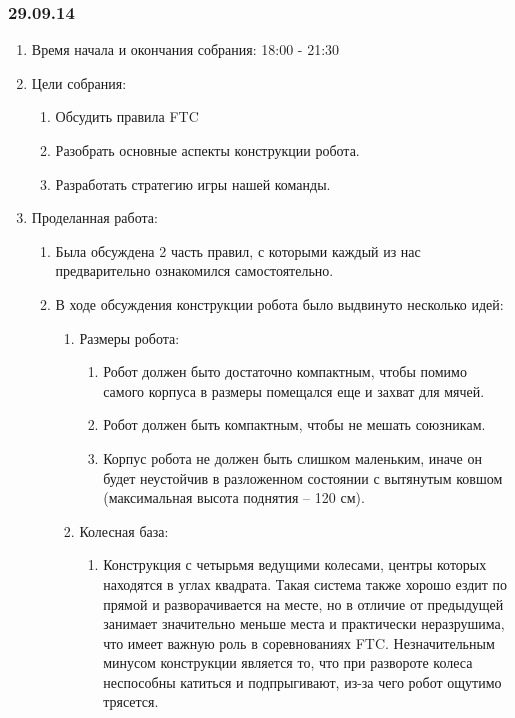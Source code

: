 	
\subsubsection{29.09.14}

\begin{enumerate}
	\item Время начала и окончания собрания:
	18:00 - 21:30
	\item Цели собрания:
	\begin{enumerate}
	  \item Обсудить правила FTC 
	  
	  \item Разобрать основные аспекты конструкции робота.
	  
      \item Разработать стратегию игры нашей команды.
    \end{enumerate}
	\item Проделанная работа:
	\begin{enumerate}
	  \item Была обсуждена 2 часть правил, с которыми каждый из нас предварительно ознакомился самостоятельно.
	  
	  \item В ходе обсуждения конструкции робота было выдвинуто несколько идей:
	  \begin{enumerate}
	    \item Размеры робота:
	    \begin{enumerate}
	      \item Робот должен быто достаточно компактным, чтобы помимо самого корпуса в размеры помещался еще и захват для мячей.
	      
	      \item Робот должен быть компактным, чтобы не мешать союзникам.
	      
	      \item Корпус робота не должен быть слишком маленьким, иначе он будет неустойчив в разложенном состоянии с вытянутым ковшом (максимальная высота поднятия – 120 см).
	      
	    \end{enumerate}
	    
	    \item Колесная база:
	    \begin{enumerate}
	      \item Конструкция с четырьмя ведущими колесами, центры которых находятся в углах квадрата. Такая система также хорошо ездит по прямой и разворачивается на месте, но в отличие от предыдущей занимает значительно меньше места и практически неразрушима, что имеет важную роль в соревнованиях FTC. Незначительным минусом конструкции является то, что при развороте колеса неспособны катиться и подпрыгивают, из-за чего робот ощутимо трясется.	
	      

\end{enumerate}
\end{enumerate}
\end{enumerate}
\end{enumerate}
